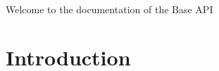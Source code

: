 Welcome to the documentation of the Base A\+PI\hypertarget{index_intro_sec}{}\section{Introduction}\label{index_intro_sec}
